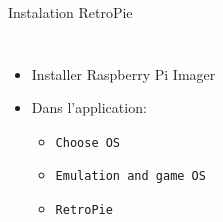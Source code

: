 \documentclass[aspectratio=169,xcolor=dvipsnames]{beamer}
\begin{document}
\begin{frame}{Instalation RetroPie}
    \begin{columns}[c] %

        \begin{itemize}
            \item Installer Raspberry Pi Imager
            \item Dans l'application:
            \begin{itemize}
                \item \texttt{Choose OS}
                \item \texttt{Emulation and game OS}
                \item \texttt{RetroPie}
            \end{itemize}
        \end{itemize}

    \end{columns}
\end{frame}
\end{document}
